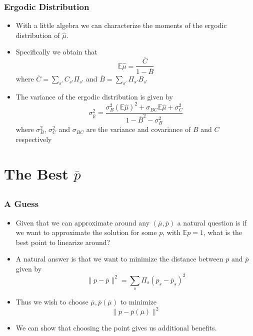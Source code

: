 \documentclass{beamer}
\newcommand{\EE}{\mathbb E}
\newcommand{\barB}{{\overline B}}
\newcommand{\barC}{{\overline C}}
\newcommand{\pbar}{{\overline p}}
\newcommand{\mubar}{{\overline \mu}}
\begin{document}
\begin{frame}
	\frametitle{Ergodic Distribution}
	\begin{itemize}
		\item  With a little algebra we can characterize the moments of the ergodic distribution of $\hat \mu$.
		\item  Specifically we obtain that 
		\[
			\EE\hat\mu = \frac{\barC}{1-\barB}
		\]where $\barC = \sum_{s'} C_{s'}\Pi_{s'}$ and $\barB = \sum_{s'}\Pi_{s'} B_{s'}$
		\item The variance of the ergodic distribution is given by
		\[
			\sigma_{\hat\mu}^2 = \frac{\sigma_B^2(\EE\hat\mu)^2 + \sigma_{BC}\EE\hat\mu + \sigma_C^2}{1-\barB^2-\sigma_B^2}
		\]where $\sigma_B^2$, $\sigma_C^2$ and $\sigma_{BC}$ are the variance and covariance of $B$ and $C$ respectively
	\end{itemize}
\end{frame}
\section{The Best $\pbar$}
\subsection{}
\begin{frame}
	\frametitle{A Guess}
	\begin{itemize}
		\item  Given that we can approximate around any $(\mubar,\pbar)$ a natural question is if we want to approximate the solution for some $p$, with $\EE p = 1$, what is the best point to linearize around?
		\item  A natural answer is that we want to minimize the distance between $p$ and $\pbar$ given by
		\[
			\| p- \pbar\|^2 = \sum_{s} \Pi_s (p_s-\pbar_s)^2
		\]
		\item  Thus we wish to choose $\mubar,\pbar(\mubar)$ to minimize
		\[
			\|p-\pbar(\mubar)\|^2
		\]
		\item  We can show that choosing the point gives us additional benefits.
	\end{itemize}
\end{frame}
\end{document}
